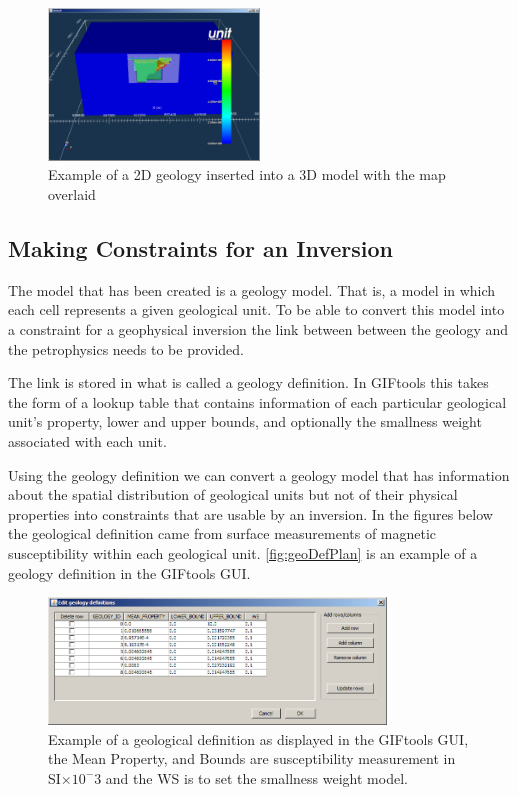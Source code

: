 \begin{figure} [h]
    \centering
    \includegraphics[width=0.5\textwidth]{images/MaptoModel/mapModelCross3D.PNG}
    \caption{Example of a 2D geology inserted into a 3D model with the map overlaid}
    \label{fig:mapModelCross3D}
\end{figure}
\FloatBarrier
\subsection{Making Constraints for an Inversion}
\label{subsec:Making Constraints for an Inversion}

The model that has been created is a geology model. That is, a model in which each cell represents a given geological unit. To be able to convert this model into a constraint for a geophysical inversion the link between between the geology and the petrophysics needs to be provided. 

The link is stored in what is called a geology definition. In GIFtools this takes the form of a lookup table that contains information of each particular geological unit's property, lower and upper bounds, and optionally the smallness weight associated with each unit. 

Using the geology definition we can convert a geology model that has information about the spatial distribution of geological units but not of their physical properties into constraints that are usable by an inversion. In the figures below the geological definition came from surface measurements of magnetic susceptibility within each geological unit. \autoref{fig:geoDefPlan} is an example of a geology definition in the GIFtools GUI.
\begin{figure} [h]
    \centering
    \includegraphics[width=0.8\textwidth]{images/MaptoModel/geoDefPlan.PNG}
    \caption{Example of a geological definition as displayed in the GIFtools GUI, the Mean Property, and Bounds are susceptibility measurement in SI$\times10^-3$ and the WS is to set the smallness weight model.}
    \label{fig:geoDefPlan}
\end{figure}

